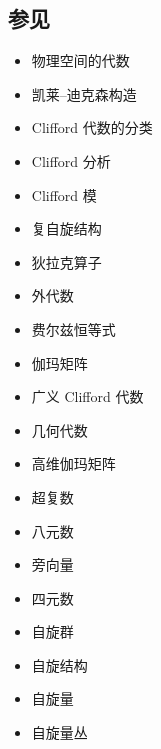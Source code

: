 \subsection{参见}
\begin{itemize}
\item 物理空间的代数
\item 凯莱–迪克森构造
\item Clifford 代数的分类
\item Clifford 分析
\item Clifford 模
\item 复自旋结构
\item 狄拉克算子
\item 外代数
\item 费尔兹恒等式
\item 伽玛矩阵
\item 广义 Clifford 代数
\item 几何代数
\item 高维伽玛矩阵
\item 超复数
\item 八元数
\item 旁向量
\item 四元数
\item 自旋群
\item 自旋结构
\item 自旋量
\item 自旋量丛
\end{itemize}
